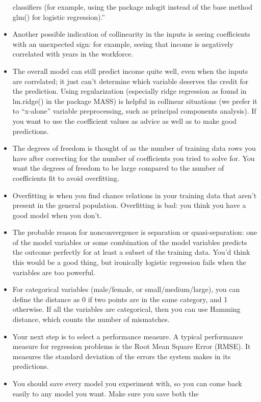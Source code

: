 \documentclass[]{book}
\theoremstyle{definition}
\theoremstyle{definition}
\theoremstyle{definition}
\theoremstyle{remark}
\begin{document}
\begin{itemize}
  classifiers (for example, using the package mlogit instead of the base
  method glm() for logistic regression).''
\item
  Another possible indication of collinearity in the inputs is seeing
  coefficients with an unexpected sign: for example, seeing that income
  is negatively correlated with years in the workforce.
\item
  The overall model can still predict income quite well, even when the
  inputs are correlated; it just can't determine which variable deserves
  the credit for the prediction. Using regularization (especially ridge
  regression as found in lm.ridge() in the package MASS) is helpful in
  collinear situations (we prefer it to ``x-alone'' variable
  preprocessing, such as principal components analysis). If you want to
  use the coefficient values as advice as well as to make good
  predictions.
\item
  The degrees of freedom is thought of as the number of training data
  rows you have after correcting for the number of coefficients you
  tried to solve for. You want the degrees of freedom to be large
  compared to the number of coefficients fit to avoid overfitting.
\item
  Overfitting is when you find chance relations in your training data
  that aren't present in the general population. Overfitting is bad: you
  think you have a good model when you don't.
\item
  The probable reason for nonconvergence is separation or
  quasi-separation: one of the model variables or some combination of
  the model variables predicts the outcome perfectly for at least a
  subset of the training data. You'd think this would be a good thing,
  but ironically logistic regression fails when the variables are too
  powerful.
\item
  For categorical variables (male/female, or small/medium/large), you
  can define the distance as 0 if two points are in the same category,
  and 1 otherwise. If all the variables are categorical, then you can
  use Hamming distance, which counts the number of mismatches.
\item
  Your next step is to select a performance measure. A typical
  performance measure for regression problems is the Root Mean Square
  Error (RMSE). It measures the standard deviation of the errors the
  system makes in its predictions.
\item
  You should save every model you experiment with, so you can come back
  easily to any model you want. Make sure you save both the

\end{itemize}
\end{document}
